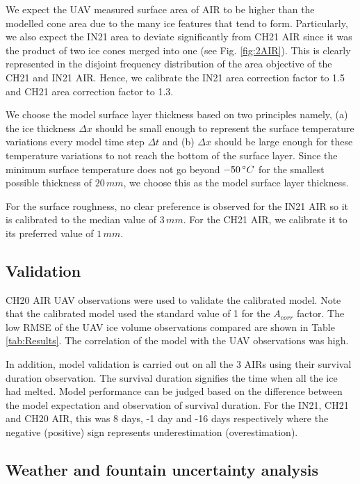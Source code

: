 \documentclass[utf8]{frontiersSCNS} %
\begin{document}
We expect the UAV measured surface area of AIR to be higher than the modelled cone area due to the many
ice features that tend to form. Particularly, we also expect the IN21 area to deviate significantly from CH21 AIR
since it was the product of two ice cones merged into one (see Fig. \ref{fig:2AIR}). This is clearly represented in
the disjoint frequency distribution of the area objective of the CH21 and IN21 AIR. Hence, we calibrate the IN21
area correction factor to 1.5 and CH21 area correction factor to 1.3.

We choose the model surface layer thickness based on two principles namely, (a) the ice thickness $\Delta x$ should
be small enough to represent the surface temperature variations every model time step $\Delta t$ and (b) $\Delta x$
should be large enough for these temperature variations to not reach the bottom of the surface layer. Since the
minimum surface temperature does not go beyond $-50 \, \degree C$ for the smallest possible thickness of $20\, mm$, we
choose this as the model surface layer thickness.

For the surface roughness, no clear preference is observed for the IN21 AIR so it is calibrated to the median
value of $3 \, mm$. For the CH21 AIR, we calibrate it to its preferred value of $1 \, mm$.

\subsection{Validation}

CH20 AIR UAV observations were used to validate the calibrated model. Note that the calibrated model used the
standard value of 1 for the $A_{corr}$ factor. The low RMSE of the UAV ice volume observations compared  are shown in
Table \ref{tab:Results}. The correlation of the model with the UAV observations was high.

In addition, model validation is carried out on all the 3 AIRs using their survival duration observation. The survival duration
signifies the time when all the ice had melted. Model performance can be judged based on the difference between the
model expectation and observation of survival duration. For the IN21, CH21 and CH20 AIR, this was 8 days, -1 day
and -16 days respectively where the negative (positive) sign represents underestimation (overestimation).

\subsection{Weather and fountain uncertainty analysis}
\end{document}
